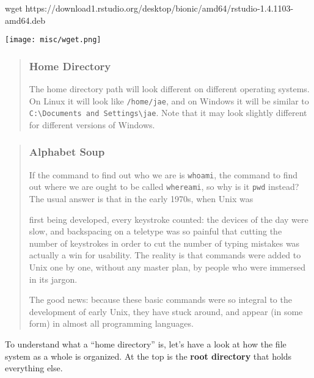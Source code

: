 \documentclass[
]{book}
\newenvironment{Shaded}{\begin{snugshade}}{\end{snugshade}}
\newcommand{\FunctionTok}[1]{\textcolor[rgb]{0.00,0.00,0.00}{#1}}
\newcommand{\NormalTok}[1]{#1}
\begin{document}
\begin{Shaded}
\begin{Highlighting}[]

\FunctionTok{wget}\NormalTok{ https://download1.rstudio.org/desktop/bionic/amd64/rstudio{-}1.4.1103{-}amd64.deb}
\end{Highlighting}
\end{Shaded}

\texttt{[image: misc/wget.png]}

\begin{quote}
\hypertarget{home-directory}{%
\subsubsection{Home Directory}\label{home-directory}}

The home directory path will look different on different operating systems. On Linux it will look like \texttt{/home/jae}, and on Windows it will be similar to \texttt{C:\textbackslash{}Documents\ and\ Settings\textbackslash{}jae}. Note that it may look slightly different for different versions of Windows.
\end{quote}

\begin{quote}
\hypertarget{alphabet-soup}{%
\subsubsection{Alphabet Soup}\label{alphabet-soup}}

If the command to find out who we are is \texttt{whoami}, the command to find out where we are ought to be called \texttt{whereami}, so why is it \texttt{pwd} instead? The usual answer is that in the early 1970s, when Unix was

first being developed, every keystroke counted: the devices of the day were slow, and backspacing on a teletype was so painful that cutting the number of keystrokes in order to cut the number of typing mistakes was actually a win for usability. The reality is that commands were added to Unix one by one, without any master plan, by people who were immersed in its jargon.

The good news: because these basic commands were so integral to the development of early Unix, they have stuck around, and appear (in some form) in almost all programming languages.
\end{quote}

To understand what a ``home directory'' is, let's have a look at how the file system as a whole is organized. At the top is the \textbf{root directory} that holds everything else.
\end{document}
